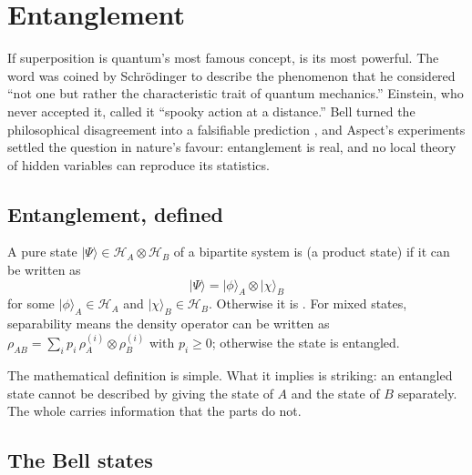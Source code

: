 \chapter{Entanglement}


If superposition is quantum's most famous concept,  is its most powerful. The word was coined by Schr\"odinger to describe the phenomenon that he considered ``not one but rather the characteristic trait of quantum mechanics.'' Einstein, who never accepted it, called it ``spooky action at a distance.'' Bell turned the philosophical disagreement into a falsifiable prediction \citep{bell_einstein_1964}, and Aspect's experiments \citep{aspect_experimental_1982} settled the question in nature's favour: entanglement is real, and no local theory of hidden variables can reproduce its statistics.

\section{Entanglement, defined}

A pure state $|\Psi\rangle \in \mathcal{H}_A \otimes \mathcal{H}_B$ of a bipartite system is  (a product state) if it can be written as
\[
  |\Psi\rangle = |\phi\rangle_A \otimes |\chi\rangle_B
\]
for some $|\phi\rangle_A \in \mathcal{H}_A$ and $|\chi\rangle_B \in \mathcal{H}_B$. Otherwise it is . For mixed states, separability means the density operator can be written as $\rho_{AB} = \sum_i p_i\,\rho_A^{(i)}\otimes\rho_B^{(i)}$ with $p_i \geq 0$; otherwise the state is entangled.

The mathematical definition is simple. What it implies is striking: an entangled state cannot be described by giving the state of $A$ and the state of $B$ separately. The whole carries information that the parts do not.

\section{The Bell states}

